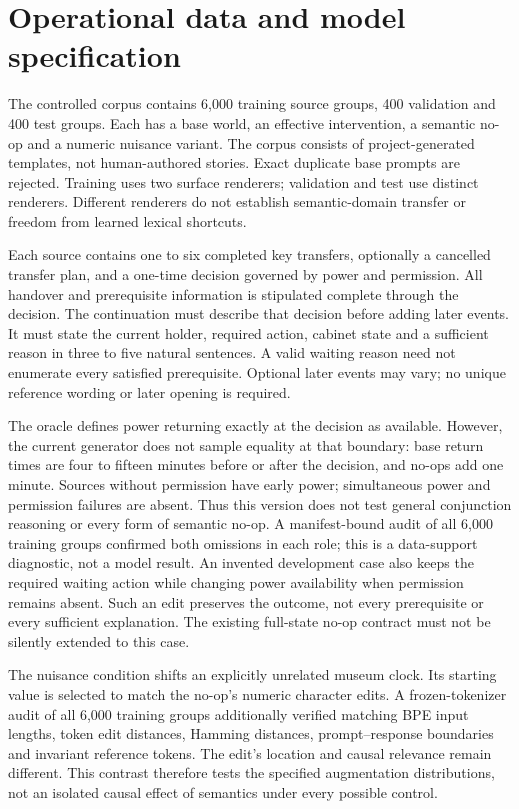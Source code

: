 \section{Operational data and model specification}
The controlled corpus contains 6,000 training source groups, 400 validation
and 400 test groups. Each has a base world, an effective intervention, a
semantic no-op and a numeric nuisance variant. The corpus consists of
project-generated templates, not human-authored stories. Exact duplicate base
prompts are rejected. Training uses two surface renderers; validation and test
use distinct renderers. Different renderers do not establish semantic-domain
transfer or freedom from learned lexical shortcuts.

Each source contains one to six completed key transfers, optionally a cancelled
transfer plan, and a one-time decision governed by power and permission. All
handover and prerequisite information is stipulated complete through the
decision. The continuation must describe that decision before adding later
events. It must state the current holder, required action, cabinet state and
a sufficient reason in three to five natural sentences. A valid waiting reason
need not enumerate every satisfied prerequisite. Optional later events may vary;
no unique reference wording or later opening is required.

The oracle defines power returning exactly at the decision as available.
However, the current generator does not sample equality at that boundary:
base return times are four to fifteen minutes before or after the decision,
and no-ops add one minute. Sources without permission have early power;
simultaneous power and permission failures are absent. Thus this version does
not test general conjunction reasoning or every form of semantic no-op.
A manifest-bound audit of all 6,000 training groups confirmed both omissions
in each role; this is a data-support diagnostic, not a model result. An invented
development case also keeps the required waiting action while changing power
availability when permission remains absent. Such an edit preserves the
outcome, not every prerequisite or every sufficient explanation. The existing
full-state no-op contract must not be silently extended to this case.

The nuisance condition shifts an explicitly unrelated museum clock. Its
starting value is selected to match the no-op's numeric character edits.
A frozen-tokenizer audit of all 6,000 training groups additionally verified
matching BPE input lengths, token edit distances, Hamming distances,
prompt--response boundaries and invariant reference tokens. The edit's location
and causal relevance remain different. This contrast therefore tests the
specified augmentation distributions, not an isolated causal effect of
semantics under every possible control.

